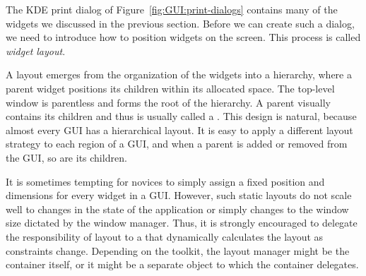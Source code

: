 



The KDE print dialog of Figure~\ref{fig:GUI:print-dialogs} contains
many of the widgets we discussed in the previous section. Before we
can create such a dialog, we need to introduce how to position widgets
on the screen. This process is called \textit{widget layout}.

A layout emerges from the organization of the widgets into a
hierarchy, where a parent widget positions its children within its
allocated space.  The top-level window is parentless and forms the
root of the hierarchy. A parent visually contains its children and
thus is usually called a . This design is natural,
because almost every GUI has a hierarchical layout. It is easy to
apply a different layout strategy to each region of a GUI, and when a
parent is added or removed from the GUI, so are its children.

It is sometimes tempting for novices to simply assign a fixed position
and dimensions for every widget in a GUI. However, such static layouts
do not scale well to changes in the state of the application or simply
changes to the window size dictated by the window manager. Thus, it is
strongly encouraged to delegate the responsibility of layout to a
 that dynamically calculates the layout as
constraints change. Depending on the toolkit, the layout manager might
be the container itself, or it might be a separate object to which the
container delegates.

